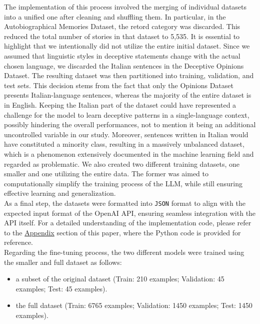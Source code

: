 \documentclass[10pt,twocolumn,letterpaper]{article}
\begin{document}
The implementation of this process involved the merging of individual datasets into a unified one after cleaning and shuffling them. 
In particular, in the Autobiographical Memories Dataset, the retord category was discarded. This reduced the total number of stories in that dataset to 5,535.
It is essential to highlight that we intentionally did not utilize the entire initial dataset. Since we assumed that linguistic styles in deceptive statements change 
with the actual chosen language, we discarded the Italian sentences in the Deceptive Opinions Dataset.
The resulting dataset was then partitioned into training, validation, and test sets. This decision stems from the fact that only the Opinions Dataset
presents Italian-language sentences, whereas the majority of the entire dataset is in English. Keeping the Italian part of the dataset could have represented
a challenge for the model to learn deceptive patterns in a single-language context, possibly hindering the overall performances, not to mention it being an additional
uncontrolled variable in our study. Moreover, sentences written in Italian would have constituted a minority class, resulting in a massively unbalanced dataset,
which is a phenomenon extensively documented in the machine learning field and regarded as problematic.
We also created two different training datasets, one smaller and one utilizing the entire data. The former was aimed to computationally simplify the training process of the LLM, 
while still ensuring effective learning and generalization. \\

As a final step, the datasets were formatted into \texttt{JSON} format to align with the expected input format of the OpenAI API, ensuring seamless integration with the API itself. 
For a detailed understanding of the implementation code, please refer to the \hyperref[sec:appendix]{Appendix} section of this paper, where the Python code is provided for reference.\\

Regarding the fine-tuning process, the two different models were trained using the smaller and full dataset as follows:

\begin{itemize}
    \item a subset of the original dataset (Train: 210 examples; Validation: 45 examples; Test: 45 examples).
    \item the full dataset (Train: 6765 examples; Validation: 1450 examples; Test: 1450 examples).
\end{itemize} \\
\end{document}
